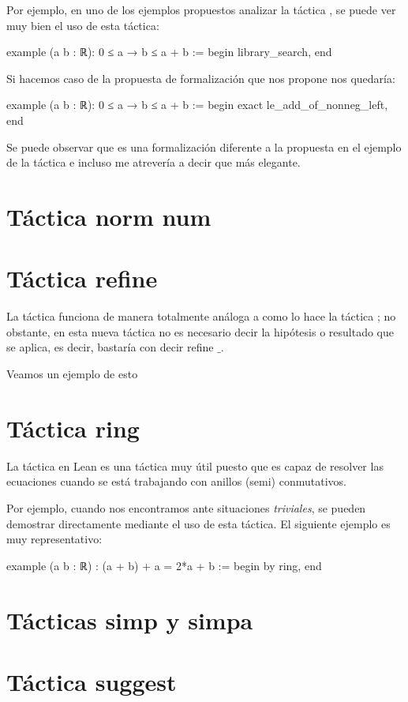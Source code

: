 Por ejemplo, en uno de los ejemplos propuestos analizar la táctica
, se puede ver muy bien el uso de esta táctica:

\begin{leancode}
example (a b : ℝ): 0 ≤ a → b ≤ a + b :=
begin
  library_search,
end
\end{leancode}

Si hacemos caso de la propuesta de formalización que nos propone nos quedaría:

\begin{leancode}
example (a b : ℝ): 0 ≤ a → b ≤ a + b :=
begin
  exact le_add_of_nonneg_left,
end
\end{leancode}

Se puede observar que es una formalización diferente a la propuesta en el
ejemplo de la táctica  e incluso me atrevería a
decir que más elegante.


\section{Táctica norm num}

\section{Táctica refine}
La táctica  funciona de manera totalmente análoga a como
lo hace la táctica ; no obstante, en esta nueva táctica no
es necesario decir la hipótesis o resultado que se aplica, es decir, bastaría
con decir refine \(\_\).

Veamos un ejemplo de esto

\section{Táctica ring}
La táctica  en Lean es una táctica muy útil puesto que es
capaz de resolver las ecuaciones cuando se está trabajando con anillos
(semi) conmutativos.

Por ejemplo, cuando nos encontramos ante situaciones \textit{triviales}, se
pueden demostrar directamente mediante el uso de esta táctica. El siguiente
ejemplo es muy representativo:

\begin{leancode}
example (a b : ℝ) : (a + b) + a = 2*a + b :=
begin
  by ring,
end
\end{leancode}

\section{Tácticas simp y simpa}


\section{Táctica suggest}

